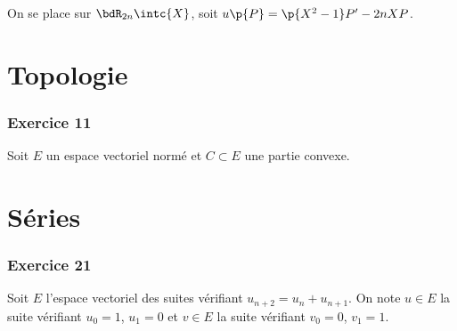 \documentclass[a4paper,french,bookmarks]{book}
\begin{document}
    
    \subsection{}
    
    On se place sur $\bdR_{2n}\intc{X}$, soit $u \p{P} = \p{X^2 - 1}P' - 2nXP$.
    
    \subsection{}
    
    \newpage
    
    \chapter{Topologie}
    
    \subsection{Exercice 11}
    
    Soit $E$ un espace vectoriel normé et $C \subset E$ une partie convexe.
    
    \chapter{Séries}
    
    \subsection*{Exercice 21}
    
    Soit $E$ l'espace vectoriel des suites vérifiant $u_{n+2} = u_n + u_{n+1}$. On note $u \in E$ la suite vérifiant $u_0 = 1$, $u_1 = 0$ et $v \in E$ la suite vérifiant $v_0 = 0$, $v_1 = 1$.
    
\end{document}
